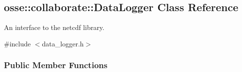 \hypertarget{classosse_1_1collaborate_1_1_data_logger}{}\subsection{osse\+:\+:collaborate\+:\+:Data\+Logger Class Reference}
\label{classosse_1_1collaborate_1_1_data_logger}


An interface to the netcdf library.  




{\ttfamily \#include $<$data\+\_\+logger.\+h$>$}

\subsubsection*{Public Member Functions}

